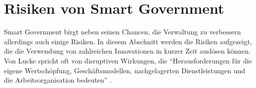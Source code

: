 \section{Risiken von Smart Government}
Smart Government birgt neben seinen Chancen, die Verwaltung zu verbessern allerdings auch einige Risiken.
In diesem Abschnitt werden die Risiken aufgezeigt, die die Verwendung von zahlreichen Innovationen in kurzer Zeit auslösen können.
Von Lucke spricht oft von disruptiven Wirkungen, die ``Herausforderungen für die eigene Wertschöpfung, Geschäftsmodellen, nachgelagerten Dienstleistungen und die Arbeitsorganisation bedeuten'' \citep[][S.172	]{von_Lucke_2016}.


